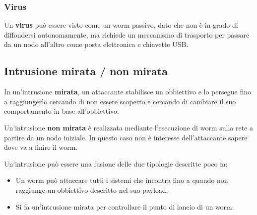 \subsubsection{Virus}
Un \textbf{virus} può essere visto come un worm passivo, dato che non è in grado di diffondersi autonomamente, ma
richiede un meccanismo di trasporto per passare da un nodo all'altro come posta elettronica e chiavette USB.

\subsection{Intrusione mirata / non mirata}
In un'intrusione \textbf{mirata}, un attaccante stabilisce un obbiettivo e lo persegue fino a raggiungerlo cercando
di non essere scoperto e cercando di cambiare il suo comportamento in base all'obbiettivo.

Un'intrusione \textbf{non mirata} è realizzata mediante l'esecuzione di worm sulla rete a partire da un nodo iniziale.
In questo caso non è interesse dell'attaccante sapere dove va a finire il worm.

Un'intrusione può essere una fusione delle due tipologie descritte poco fa:
\begin{itemize}
	\item Un worm può attaccare tutti i sistemi che incontra fino a quando non raggiunge un obbiettivo descritto nel
	      suo payload.
	\item Si fa un'intrusione mirata per controllare il punto di lancio di un worm.
\end{itemize}

